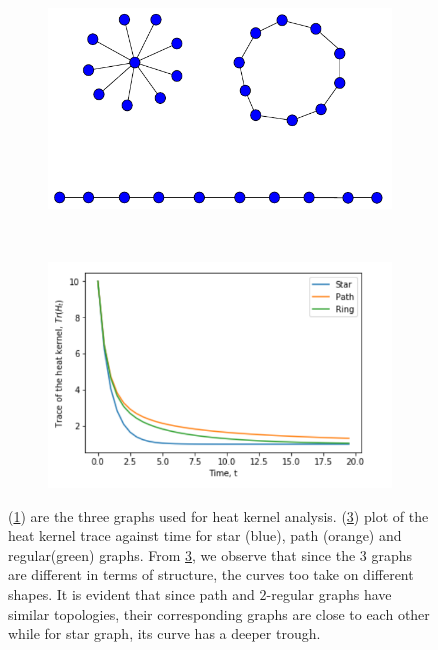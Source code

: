 \documentclass[10pt,a4paper]{article}
\begin{document}
\begin{enumerate}[1]
        	\begin{figure}[H]
        		\centering
        		\begin{subfigure}[b]{0.45\textwidth}
        			\includegraphics[width= \textwidth]{images/kernel-graphs.pdf}
        			\caption{}
        			\label{kernelgraphs}
        		\end{subfigure}~
        		\begin{subfigure}[b]{0.45\textwidth}
        			\includegraphics[width= \textwidth]{images/Trace-kernel-plot}
        			\caption{}
        			\label{plot-kernel}
        		\end{subfigure}
        	\caption{(\ref{kernelgraphs}) are the three graphs used for heat kernel analysis. (\ref{plot-kernel}) plot of the heat kernel trace against time for star (blue), path (orange) and regular(green) graphs. From \ref{plot-kernel}, we observe that since the $3$ graphs are different in terms of structure, the curves too take on different shapes. It is evident that since path and $2$-regular graphs have similar topologies, their corresponding graphs are close to each other while for star graph, its curve has a deeper trough. }
        	\end{figure}
        

\end{enumerate}
\end{document}
